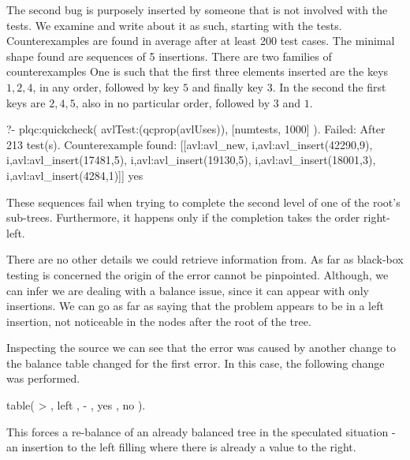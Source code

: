 The second bug is purposely inserted by someone that is not involved
with the tests.
%
We examine and write about it as such, starting with the tests.
%
Counterexamples are found in average after at least 200 test cases.
%
The minimal shape found are sequences of 5 insertions.
%
There are two families of counterexamples
%
One is such that the first three elements inserted are the keys $1, 2,
4$, in any order, followed by key $5$ and finally key $3$.
%
In the second the first keys are $2, 4, 5$, also in no particular order,
followed by $3$ and $1$.
%
\begin{yapcode}
   ?- plqc:quickcheck(
               avlTest:(qcprop(avlUses)),
               [{numtests, 1000}] ).
 Failed: After 213 test(s).
 Counterexample found:
   [[avl:avl_new,
     {i,avl:avl_insert(42290,9)},
     {i,avl:avl_insert(17481,5)},
     {i,avl:avl_insert(19130,5)},
     {i,avl:avl_insert(18001,3)},
     {i,avl:avl_insert(4284,1)}]]
 yes
\end{yapcode}
%
These sequences fail when trying to complete the second level of one of
the root's sub-trees.
%
Furthermore, it happens only if the completion takes the order
right-left.


There are no other details we could retrieve information from.
%
As far as black-box testing is concerned the origin of the error cannot
be pinpointed.
%
Although, we can infer we are dealing with a balance issue, since it can
appear with only insertions.
%
We can go as far as saying that the problem appears to be in a left
insertion, not noticeable in the nodes after the root of the tree.


Inspecting the source we can see that the error was caused by another
change to the balance table changed for the first error.
%
In this case, the following change was performed.
%
\begin{yapcode}
 table( >   , left   , -   , yes    , no ).
\end{yapcode}
%
This forces a re-balance of an already balanced tree in the speculated
situation - an insertion to the left filling where there is already a
value to the right.





\begin{yapcode}
\end{yapcode}
\begin{yapcode}
\end{yapcode}
